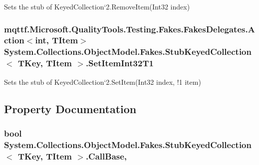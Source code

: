 Sets the stub of Keyed\-Collection`2.Remove\-Item(\-Int32 index)

\hypertarget{class_system_1_1_collections_1_1_object_model_1_1_fakes_1_1_stub_keyed_collection_3_01_t_key_00_01_t_item_01_4_ad19d1cd16818aeafacb9b762a511b675}{
\subsubsection[{Set\-Item\-Int32\-T1}]{\setlength{\rightskip}{0pt plus 5cm}mqttf.\-Microsoft.\-Quality\-Tools.\-Testing.\-Fakes.\-Fakes\-Delegates.\-Action$<$int, T\-Item$>$ System.\-Collections.\-Object\-Model.\-Fakes.\-Stub\-Keyed\-Collection$<$ T\-Key, T\-Item $>$.Set\-Item\-Int32\-T1}}\label{class_system_1_1_collections_1_1_object_model_1_1_fakes_1_1_stub_keyed_collection_3_01_t_key_00_01_t_item_01_4_ad19d1cd16818aeafacb9b762a511b675}


Sets the stub of Keyed\-Collection`2.Set\-Item(Int32 index, !1 item)



\subsection{Property Documentation}
\hypertarget{class_system_1_1_collections_1_1_object_model_1_1_fakes_1_1_stub_keyed_collection_3_01_t_key_00_01_t_item_01_4_a68065d19a06ae6c160ee0ae33d4d8fbf}{
\subsubsection[{Call\-Base}]{\setlength{\rightskip}{0pt plus 5cm}bool System.\-Collections.\-Object\-Model.\-Fakes.\-Stub\-Keyed\-Collection$<$ T\-Key, T\-Item $>$.Call\-Base\hspace{0.3cm}{\ttfamily [get]}, {\ttfamily [set]}}}\label{class_system_1_1_collections_1_1_object_model_1_1_fakes_1_1_stub_keyed_collection_3_01_t_key_00_01_t_item_01_4_a68065d19a06ae6c160ee0ae33d4d8fbf}


